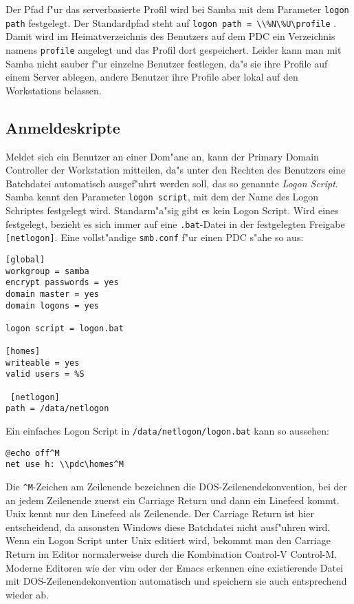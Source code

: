 \documentclass{scrartcl}\usepackage{pslatex}\typearea{12}
\newcommand{\param}{\texttt}
\newcommand{\dateistyle}{\texttt}
\newcommand{\todo}[1]{}
\begin{document}
Der Pfad f"ur das serverbasierte Profil wird bei Samba mit dem
Parameter \param{logon path} festgelegt. Der Standardpfad steht auf
\param{logon path =
\textbackslash{}\textbackslash{}\%N\textbackslash{}\%U\textbackslash{}profile}
.
Damit wird im Heimatverzeichnis des Benutzers auf dem PDC ein
Verzeichnis namens \dateistyle{profile} angelegt und das Profil dort
gespeichert.  Leider kann man mit Samba nicht sauber f"ur einzelne
Benutzer festlegen, da"s sie ihre Profile auf einem Server ablegen,
andere Benutzer ihre Profile aber lokal auf den Workstations belassen.

\todo{logon home f"ur win95}

\subsection{Anmeldeskripte}

Meldet sich ein Benutzer an einer Dom"ane an, kann der Primary Domain
Controller der Workstation mitteilen, da"s unter den Rechten des Benutzers
eine Batchdatei automatisch ausgef"uhrt werden soll, das so genannte
\emph{Logon Script}. Samba kennt den Parameter \param{logon
  script}, mit dem der Name des Logon Schriptes festgelegt wird.
Standarm"a"sig gibt es kein Logon Script. Wird eines festgelegt,
bezieht es sich immer auf eine \dateistyle{.bat}-Datei in der
festgelegten Freigabe \param{[netlogon]}. Eine vollst"andige
\dateistyle{smb.conf} f"ur einen PDC s"ahe so aus:

\begin{verbatim}
[global]
workgroup = samba
encrypt passwords = yes
domain master = yes
domain logons = yes

logon script = logon.bat

[homes]
writeable = yes
valid users = %S

 [netlogon]
path = /data/netlogon
\end{verbatim}

Ein einfaches Logon Script in \dateistyle{/data/netlogon/logon.bat}
kann so aussehen:

\begin{verbatim}
@echo off^M
net use h: \\pdc\homes^M
\end{verbatim}

Die \verb|^M|-Zeichen am Zeilenende bezeichnen die
DOS-Zeilenendekonvention, bei der an jedem Zeilenende zuerst ein
Carriage Return und dann ein Linefeed kommt. Unix kennt nur den
Linefeed als Zeilenende. Der Carriage Return ist hier entscheidend, da
ansonsten Windows diese Batchdatei nicht ausf"uhren wird. Wenn ein
Logon Script unter Unix editiert wird, bekommt man den Carriage Return
im Editor normalerweise durch die Kombination Control-V Control-M.
Moderne Editoren wie der vim oder der Emacs erkennen eine existierende
Datei mit DOS-Zeilenendekonvention automatisch und speichern sie auch
entsprechend wieder ab.
\end{document}
